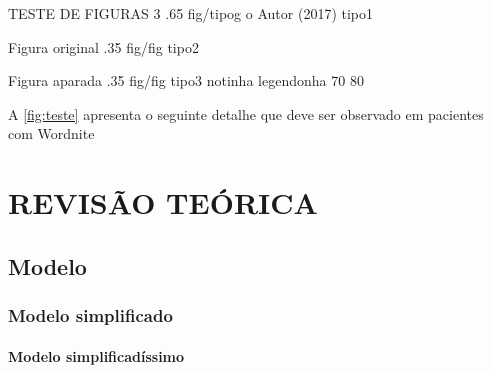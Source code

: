 \figura
{TESTE DE FIGURAS 3} %
{.65} %
{fig/tipog} %
{o Autor (2017)} %
{tipo1} %
{}
{}

\figura
{Figura original} %
{.35} %
{fig/fig} %
{\textcite{luminaria01}} %
{tipo2} %
{}
{}

\figurac
{Figura aparada} %
{.35} %
{fig/fig} %
{\textcite{luminaria01}} %
{tipo3} %
{notinha}   %
{legendonha} %
{70} %
{80} %


A \autoref{fig:teste} apresenta o seguinte detalhe que deve ser observado em pacientes com Wordnite

\chapter{REVISÃO TEÓRICA}

\textcite[3.1-3.2]{abntex2modelo}

\textcite{luminaria01}

\textcite{luminaria01}


\textcite{luminaria01}



\textcite{luminaria01}

\textcite{ISO5122:1979}

\section{Modelo}

\subsection{Modelo simplificado}
\newpage
\textcite[3.1-3.2]{abntex2modelo}

\subsubsection{Modelo simplificadíssimo}
